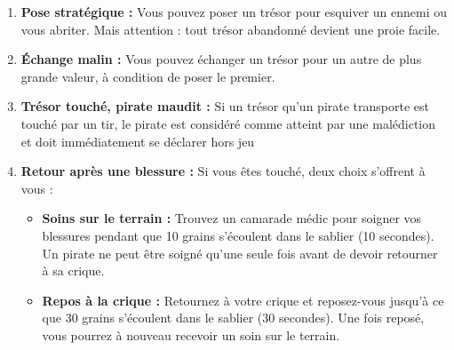 \documentclass{pirategame}
\begin{document}
\begin{enumerate}[resume*=rules]
  \item \textbf{Pose stratégique :} Vous pouvez poser un trésor pour esquiver un ennemi ou vous abriter. Mais attention : tout trésor abandonné devient une proie facile.
  \item \textbf{Échange malin :} Vous pouvez échanger un trésor pour un autre de plus grande valeur, à condition de poser le premier.
  \item \textbf{Trésor touché, pirate maudit :} Si un trésor qu’un pirate transporte est touché par un tir, le pirate est considéré comme atteint par une malédiction et doit immédiatement se déclarer hors jeu
  \item \textbf{Retour après une blessure :} Si vous êtes touché, deux choix s'offrent à vous :
  \begin{itemize}
    \item \textbf{Soins sur le terrain :} Trouvez un camarade médic pour soigner vos blessures pendant que 10 grains s’écoulent dans le sablier (10 secondes). Un pirate ne peut être soigné qu’une seule fois avant de devoir retourner à sa crique.
    \item \textbf{Repos à la crique :} Retournez à votre crique et reposez-vous jusqu’à ce que 30 grains s’écoulent dans le sablier (30 secondes). Une fois reposé, vous pourrez à nouveau recevoir un soin sur le terrain.
  \end{itemize}
\end{enumerate}
\end{document}
